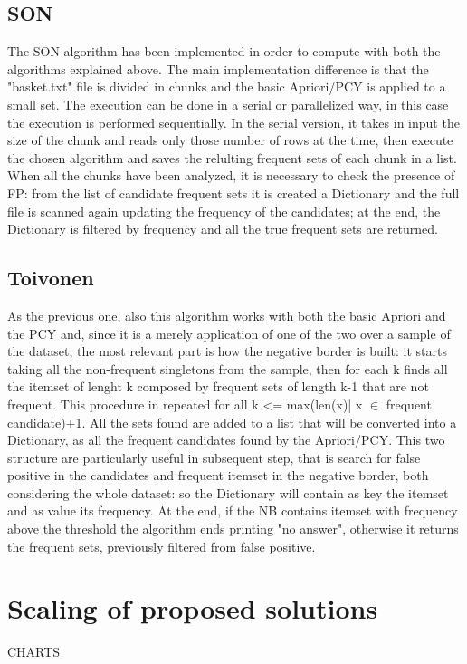 \documentclass[14pt]{extarticle}
\begin{document}
\subsection{SON}
The SON algorithm has been implemented in order to compute with both the algorithms explained above. The main implementation difference is that the "basket.txt" file is divided in chunks and the basic Apriori/PCY is applied to a small set. The execution can be done in a serial or parallelized way, in this case the execution is performed sequentially. In the serial version, it takes in input the size of the chunk and reads only those number of rows at the time, then execute the chosen algorithm and saves the relulting frequent sets of each chunk in a list. When all the chunks have been analyzed, it is necessary to check the presence of FP: from the list of candidate frequent sets it is created a Dictionary and the full file is scanned again updating the frequency of the candidates; at the end, the Dictionary is filtered by frequency and all the true frequent sets are returned.

\subsection{Toivonen}
As the previous one, also this algorithm works with both the basic Apriori and the PCY and, since it is a merely application of one of the two over a sample of the dataset, the most relevant part is how the negative border is built: it starts taking all the non-frequent singletons from the sample, then for each k finds all the itemset of lenght k composed by frequent sets of length k-1 that are not frequent. This procedure in repeated for all k <= max(len(x)| x $\in$ {frequent candidate})+1. All the sets found are added to a list that will be converted into a Dictionary, as all the frequent candidates found by the Apriori/PCY. This two structure are particularly useful in subsequent step, that is search for false positive in the candidates and frequent itemset in the negative border, both considering the whole dataset: so the Dictionary will contain as key the itemset and as value its frequency.
At the end, if the NB contains itemset with frequency above the threshold the algorithm ends printing "no answer", otherwise it returns the frequent sets, previously filtered from false positive.

\section{Scaling of proposed solutions}
CHARTS
\end{document}
